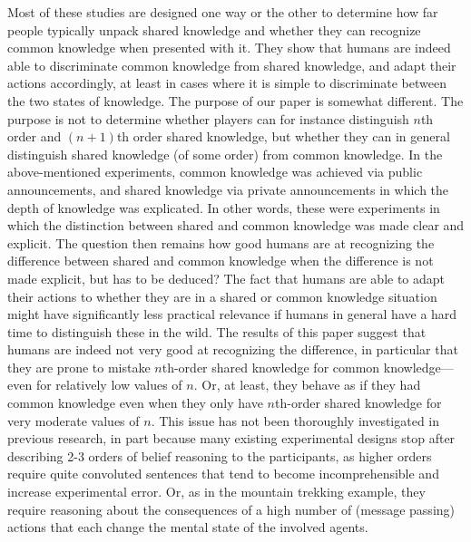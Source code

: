 Most of these studies are designed one way or the other to determine how far people typically unpack shared knowledge and whether they can recognize common knowledge when presented with it. They show that humans are indeed able to discriminate common knowledge from shared knowledge, and adapt their actions accordingly, at least in cases where it is simple to discriminate between the two states of knowledge. The purpose of our paper is somewhat different. The purpose is not to determine whether players can for instance distinguish $n$th order and $(n+1)$th order shared knowledge, but whether they can in general distinguish shared knowledge (of some order) from common knowledge. In the above-mentioned experiments, common knowledge was achieved via public announcements, and shared knowledge via private announcements in which the depth of knowledge was explicated. In other words, these were experiments in which the distinction between shared and common knowledge was made clear and explicit. The question then remains how good humans are at recognizing the difference between shared and common knowledge when the difference is not made explicit, but has to be deduced? The fact that humans are able to adapt their actions to whether they are in a shared or common knowledge situation might have significantly less practical relevance if humans in general have a hard time to distinguish these in the wild. The results of this paper suggest that humans are indeed not very good at recognizing the difference, in particular that they are prone to mistake $n$th-order shared knowledge for common knowledge---even for relatively low values of $n$. Or, at least, they behave as if they had common knowledge even when they only have $n$th-order shared knowledge for very moderate values of $n$. %
This issue has not been thoroughly investigated in previous research, in part because many existing experimental designs stop after describing 2-3 orders of belief reasoning to the participants, as higher orders require quite convoluted sentences that tend to become incomprehensible and increase experimental error. Or, as in the mountain trekking example, they require reasoning about the consequences of a high number of (message passing) actions that each change the mental state of the involved agents.

